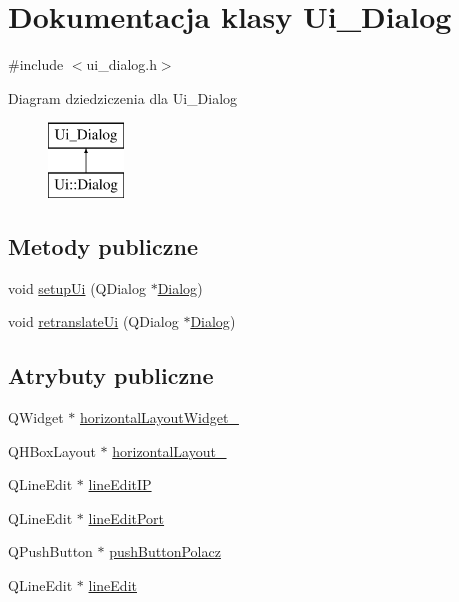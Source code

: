 \hypertarget{classUi__Dialog}{\section{Dokumentacja klasy Ui\-\_\-\-Dialog}
\label{classUi__Dialog}
}


{\ttfamily \#include $<$ui\-\_\-dialog.\-h$>$}

Diagram dziedziczenia dla Ui\-\_\-\-Dialog\begin{figure}[H]
\begin{center}
\leavevmode
\includegraphics[height=2.000000cm]{d7/d7b/classUi__Dialog}
\end{center}
\end{figure}
\subsection*{Metody publiczne}
\begin{DoxyCompactItemize}
\item 
void \hyperlink{classUi__Dialog_a4f6a478c3ecdafabffb17b39cb26444a}{setup\-Ui} (Q\-Dialog $\ast$\hyperlink{classDialog}{Dialog})
\item 
void \hyperlink{classUi__Dialog_afa0ccb6f716ca6178260522a193c250e}{retranslate\-Ui} (Q\-Dialog $\ast$\hyperlink{classDialog}{Dialog})
\end{DoxyCompactItemize}
\subsection*{Atrybuty publiczne}
\begin{DoxyCompactItemize}
\item 
Q\-Widget $\ast$ \hyperlink{classUi__Dialog_a4a01239907c0d25e55efbe5811d64e94}{horizontal\-Layout\-Widget\-\_}
\item 
Q\-H\-Box\-Layout $\ast$ \hyperlink{classUi__Dialog_a289b49bcdd28408efe2510f029535c2b}{horizontal\-Layout\-\_}
\item 
Q\-Line\-Edit $\ast$ \hyperlink{classUi__Dialog_ab46d172e983ee875ea7d404f0e9cffeb}{line\-Edit\-I\-P}
\item 
Q\-Line\-Edit $\ast$ \hyperlink{classUi__Dialog_af72591b169533ffca5bfb1aef6771696}{line\-Edit\-Port}
\item 
Q\-Push\-Button $\ast$ \hyperlink{classUi__Dialog_a80234b371a2b143b74be0c4351ad2267}{push\-Button\-Polacz}
\item 
Q\-Line\-Edit $\ast$ \hyperlink{classUi__Dialog_a934cf16b9b36614a93f04261c652c1c7}{line\-Edit}
\end{DoxyCompactItemize}


